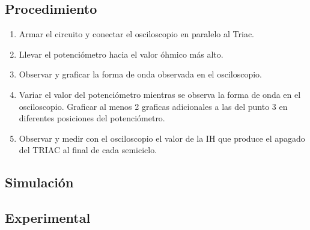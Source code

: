 \subsection{Procedimiento}
\begin{enumerate}
  \item Armar el circuito y conectar el osciloscopio en paralelo al Triac.
  \item Llevar el potenciómetro hacia el valor óhmico más alto.
  \item Observar y graficar la forma de onda observada en el osciloscopio.
  \item Variar el valor del potenciómetro mientras se observa la forma de onda en
    el osciloscopio. Graficar al menos 2 graficas adicionales a las del punto 3 en
    diferentes posiciones del potenciómetro.
  \item Observar y medir con el osciloscopio el valor de la IH que produce el
    apagado del TRIAC al final de cada semiciclo.

\end{enumerate}
\subsection{Simulación}

\subsection{Experimental}




